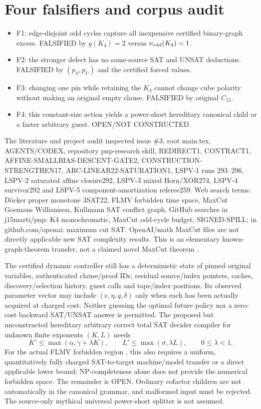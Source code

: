 \documentclass[11pt]{article}
\begin{document}
\section{Four falsifiers and corpus audit}
\begin{itemize}
\item[] F1: edge-disjoint odd cycles capture all inexpensive certified binary-graph excess. FALSIFIED by $q(K_4)=2$ versus $\nu_{\rm odd}(K_4)=1$.
\item[] F2: the stronger defect has no same-source SAT and UNSAT deductions. FALSIFIED by $(p_S,p_U)$ and the certified forced values.
\item[] F3: changing one pin while retaining the $K_4$ cannot change cube polarity without making an original empty clause. FALSIFIED by original $C_{15}$.
\item[] F4: this constant-size action yields a power-short hereditary canonical child or a faster arbitrary guest. OPEN/NOT CONSTRUCTED.
\end{itemize}
The literature and project audit inspected issue \#3, root main.tex, AGENTS/CODEX, repository pnp-research skill, REDIRECT1, CONTRACT1, AFFINE-SMALLBIAS-DESCENT-GATE2, CONSTRUCTION-STRENGTHEN17, ARC-LINEAR22-SATURATION1, LSPV-1 runs 293--296, LSPV-2 saturated affine closure292, LSPV-3 mixed Horn/XOR274, LSPV-4 survivor292 and LSPV-5 component-amortization referee259. Web search terms: D\"ocker proper monotone 3SAT22, FLMV forbidden time space, MaxCut Goemans Williamson, Kullmann SAT conflict graph. GitHub searches in j15marti/pnp: K4 monochromatic, MaxCut odd-cycle budget, SIGNED-SPILL; in github.com/openai: maximum cut SAT. OpenAI/math MaxCut files are not directly applicable new SAT complexity results. This is an elementary known-graph-theorem transfer, not a claimed novel MaxCut theorem \cite{goemans1995,kullmann2011}.

The certified dynamic controller still has a deterministic state of pinned original variables, authenticated clause/proof IDs, residual source/index pointers, caches, discovery/selection history, guest calls and tape/index positions. Its observed parameter vector may include $(e,\eta,q,\delta)$ only when each has been actually acquired at charged cost. Neither guessing the optimal future policy nor a zero-cost backward SAT/UNSAT answer is permitted. The proposed but unconstructed hereditary arbitrary correct total SAT decider compiler for unknown finite exponents $(K,L)$ needs
\[
K'\le\max(\alpha,\gamma+\lambda K),\qquad
L'\le\max(\sigma,\lambda L),\qquad 0\le\lambda<1.
\]
For the actual FLMV forbidden region \cite{flmv2005}, this also requires a uniform, quantitatively fully charged SAT-to-target machine/model transfer or a direct applicable lower bound; NP-completeness alone does not provide the numerical forbidden space. The remainder is OPEN. Ordinary cofactor children are not automatically in the canonical grammar, and malformed input must be rejected. The source-only mythical universal power-short splitter is not assumed.
\end{document}
